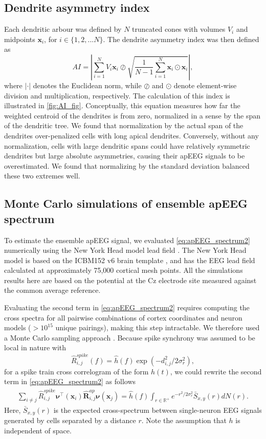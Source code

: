 \subsection{Dendrite asymmetry index}
Each dendritic arbour was defined by $N$ truncated cones with volumes $V_i$ and midpoints $\bm{x}_i$, for $i\in\{1,2,...N\}$. The dendrite asymmetry index was then defined as
\begin{equation} \label{eq:AI}
    AI = \left | \sum_{i=1}^N V_i \bm{x}_i \oslash \sqrt{\frac{1}{N-1} \sum_{i=1}^N \bm{x}_i \odot \bm{x}_i} \right |\mathrm{,}
\end{equation}
where $\left | \cdot \right |$ denotes the Euclidean norm, while $\oslash$ and $\odot$ denote element-wise division and multiplication, respectively. The calculation of this index is illustrated in {\autoref{fig:AI_fig}}. Conceptually, this equation measures how far the weighted centroid of the dendrites is from zero, normalized in a sense by the span of the dendritic tree. We found that normalization by the actual span of the dendrites over-penalized cells with long apical dendrites. Conversely, without any normalization, cells with large dendritic spans could have relatively symmetric dendrites but large absolute asymmetries, causing their apEEG signals to be overestimated. We found that normalizing by the standard deviation balanced these two extremes well.

\subsection{Monte Carlo simulations of ensemble apEEG spectrum}
To estimate the ensemble apEEG signal, we evaluated {\ref{eq:apEEG_spectrum2}} numerically using the New York Head model lead field \cite{Huang2016}. The New York Head model is based on the ICBM152 v6 brain template \cite{Fonov2009,Fonov2011}, and has the EEG lead field calculated at approximately 75,000 cortical mesh points. All the simulations results here are based on the potential at the Cz electrode site measured against the common average reference.

Evaluating the second term in {\ref{eq:apEEG_spectrum2}} requires computing the cross spectra for all pairwise combinations of cortex coordinates and neuron models ($>10^{15}$ unique pairings), making this step intractable. We therefore used a Monte Carlo sampling approach \cite{Robert2004}. Because spike synchrony was assumed to be local in nature with
\begin{equation*}
    \hat{R}^{spike}_{i,j}(f) = \hat{h}(f) \exp(-d_{i,j}^2/2\sigma_r^2)\mathrm{,}
\end{equation*}
for a spike train cross correlogram of the form $h(t)$, we could rewrite the second term in {\ref{eq:apEEG_spectrum2}} as follows
\begin{align*}
    \sum_{i\ne j} \hat{R}^{spike}_{i,j} \bm{\nu}^\intercal(\bm{x}_i) \hat{\bm{R}}^{ap}_{i,j}\bm{\nu}(\bm{x}_j) = \hat{h}(f) \int_{r\in\mathbb{R}^+}  e^{-r^2/2\sigma_r^2} \bar{S}_{x,y}(r) dN(r)\mathrm{.}
\end{align*}
Here, $\bar{S}_{x,y}(r)$ is the expected cross-spectrum between single-neuron EEG signals generated by cells separated by a distance $r$. Note the assumption that $h$ is independent of space.

